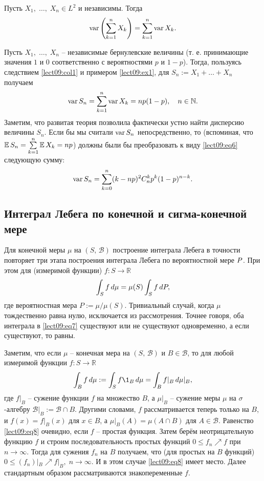 \begin{col}\label{lect09:col1}
Пусть $X_1,\;\ldots,\;X_n\in L^2$ и независимы. Тогда
\begin{equation}\label{leqt09:eq5}
\var\left(\sum_{k=1}^nX_k\right)=\sum_{k=1}^n\var X_k.
\end{equation}
\end{col}

\begin{example}\label{lect09:ex2}
Пусть $X_1,\;\ldots,\;X_n$ -- независимые бернулевские величины (т. е. принимающие значения $1$ и $0$ соответственно с вероятностями $p$ и $1-p$). Тогда, пользуясь следствием \ref{lect09:col1} и примером \ref{lect09:ex1}, для $S_n:=X_1+\ldots+X_n$ получаем
\begin{equation}\label{lect09:eq6}
\var S_n=\sum_{k=1}^n\var X_k=np(1-p),\quad n\in\mathbb{N}.
\end{equation}
Заметим, что развитая теория позволила фактически устно найти дисперсию величины $S_n$. Если бы мы считали $\var S_n$ непосредственно, то (вспоминая, что $\E S_n=\sum\limits_{k=1}^n\E X_k=np$) должны были бы преобразовать к виду \ref{lect09:eq6} следующую сумму:
\[ \var S_n=\sum_{k=0}^n(k-np)^2C_n^kp^k(1-p)^{n-k}. \]
\end{example}

\subsection{Интеграл Лебега по конечной и сигма-конечной мере}

Для конечной меры $\mu$ на $(S,\,\mathcal{B})$ построение интеграла Лебега в точности повторяет три этапа построения интеграла Лебега по вероятностной мере $\P$. При этом для (измеримой функции) $f\colon S\to\mathbb{R}$ 
\begin{equation}\label{lect09:eq7}
\int_Sf\,d\mu=\mu(S)\int_Sf\,d\P,
\end{equation}
где вероятностная мера $P:=\mu/\mu(S)$. Тривиальный случай, когда $\mu$ тождественно равна нулю, исключается из рассмотрения. Точнее говоря, оба интеграла в \ref{lect09:eq7} существуют или не существуют одновременно, а если существуют, то равны.

Заметим, что если $\mu$ -- конечная мера на $(S,\,\mathcal{B})$ и $B\in\mathcal{B}$, то для любой измеримой функции $f\colon S\to\mathbb{R}$ 
\begin{equation}\label{lect09:eq8}
\int_Bf\,d\mu:=\int_Sf\1_B\,d\mu=\int_B f|_B\,d\mu|_B,
\end{equation}
где $f|_B$ -- сужение функции $f$ на множество $B$, а $\mu|_B$ -- сужение меры $\mu$ на $\sigma$-алгебру $\mathcal{B}|_B:=\mathcal{B}\cap B$. Другими словами, $f$ рассматривается теперь только на $B$, и $f(x)=f|_B(x)$ для $x\in B$, а $\mu|_B(A)=\mu(A\cap B)$ для $A\in\mathcal{B}$. Равенство \ref{lect09:eq8} очевидно, если $f$ -- простая функция. Затем берём неотрицательную функцию $f$ и строим последовательность простых функций $0\leqslant f_n\nearrow f$ при $n\to\infty$. Тогда для сужения $f_n$ на $B$ получаем, что (для простых на $B$ функций) $0\leqslant (f_n)|_B\nearrow f|_B,\;n\to\infty$. И в этом случае \ref{lect09:eq8} имеет место. Далее стандартным образом рассматриваются знакопеременные $f$.

